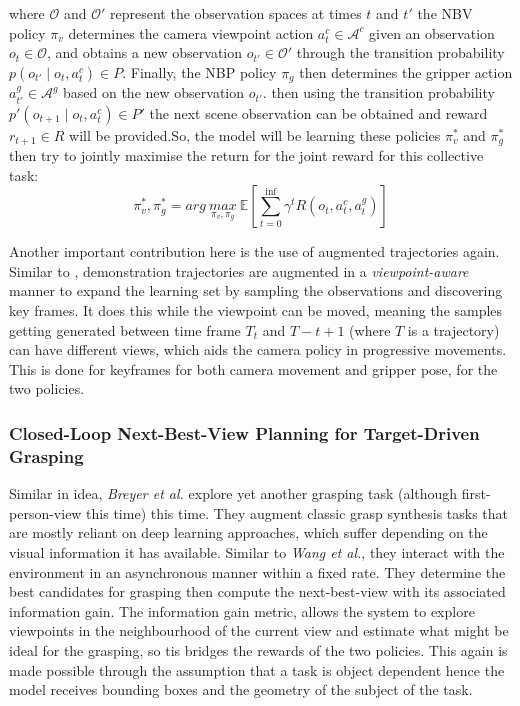 where $\mathcal{O}$ and $\mathcal{O}'$ represent the observation spaces at times $t$ and $t'$ the NBV policy $\pi_v$ determines the camera viewpoint action $a_t^c \in \mathcal{A}^c$ given an observation $o_t \in \mathcal{O}$, and obtains a new observation $o_{t'} \in \mathcal{O}'$ through the transition probability $p\left(o_{t'} \mid o_t, a_t^c\right) \in P$. Finally, the NBP policy $\pi_g$ then determines the gripper action $a^g_{t'} \in \mathcal{A}^g$ based on the new observation $o_{t'}$. then using the transition probability $p'\left(o_{t+1} \mid o_t, a^c_t\right) \in P'$ the next scene observation can be obtained and reward $r_{t+1} \in R$ will be provided.So, the model will be learning these policies $\pi^*_v$ and $\pi^*_g$ then try to jointly maximise the return for the joint reward for this collective task: 
\[
  \pi_v^*, \pi_g^* = 
  arg~\underset{\pi_v, \pi_g}{max} 
  ~\mathbb{E}
  \left[
    \sum_{t=0}^{\inf}{\gamma^t R(o_t, a^c_t, a^g_t)}
  \right]
\]

Another important contribution here is the use of augmented trajectories again. Similar to \cite{papagiannis2024milesmakingimitationlearning}, demonstration trajectories are augmented in a \emph{viewpoint-aware} manner to expand the learning set by sampling the observations and discovering key frames. It does this while the viewpoint can be moved, meaning the samples getting generated between time frame $T_t$ and $T-{t+1}$ (where $T$ is a trajectory) can have different views, which aids the camera policy in progressive movements. This is done for keyframes for both camera movement and gripper pose, for the two policies.

\subsubsection{Closed-Loop Next-Best-View Planning for Target-Driven Grasping}
Similar in idea, \emph{Breyer et al.} explore yet another grasping task (although first-person-view this time) this time. They augment classic grasp synthesis tasks that are mostly reliant on deep learning approaches, which suffer depending on the visual information it has available. Similar to \emph{Wang et al.}, they interact with the environment in an asynchronous manner within a fixed rate. They determine the best candidates for grasping then compute the next-best-view with its associated information gain. 
The information gain metric, allows the system to explore viewpoints in the neighbourhood of the current view and estimate what might be ideal for the grasping, so tis bridges the rewards of the two policies. This again is made possible through the assumption that a task is object dependent hence the model receives bounding boxes and the geometry of the subject of the task.

